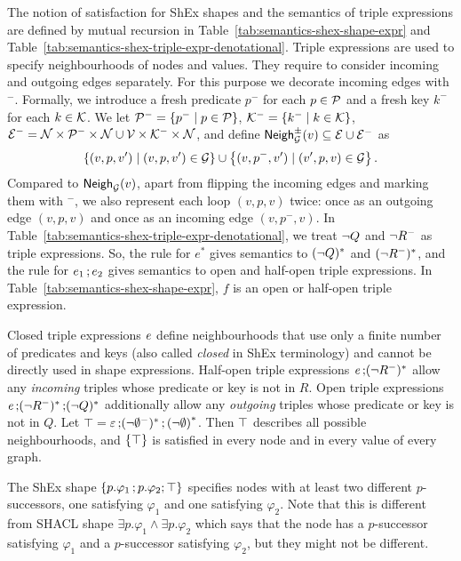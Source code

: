 The notion of satisfaction for ShEx shapes and the semantics of triple expressions are defined by mutual recursion in Table~\ref{tab:semantics-shex-shape-expr} and Table~\ref{tab:semantics-shex-triple-expr-denotational}.
Triple expressions are used to specify neighbourhoods of nodes and values. They require to consider incoming and outgoing edges separately. For this purpose we decorate incoming edges with ${}^{-}$. Formally, we introduce a fresh predicate $p^{-}$ for each $p\in\mathcal{P}$ and a fresh key $k^{-}$ for each $k\in\mathcal{K}$. We  let $\mathcal{P}^{-}= \left\{p^{-} \mid p\in \mathcal{P}\right\}$,
$\mathcal{K}^{-}= \left\{k^{-} \mid k\in \mathcal{K}\right\}$,
$\mathcal{E}^{-} = \mathcal{N} \times \mathcal{P}^{-} \times \mathcal{N} \cup \mathcal{V} \times \mathcal{K}^{-} \times \mathcal{N}$, and define $\mathsf{Neigh}^{\pm}_{\mathcal{G}}(v) \subseteq \mathcal{E} \cup\mathcal{E}^{-}$ as
\[ \left \{ (v, p, v') \mid (v, p, v') \in \mathcal{G}\right\} \cup \left\{(v, p^{-}, v') \mid (v', p, v) \in \mathcal{G} \right\}.\] Compared to $\mathsf{Neigh}_{\mathcal{G}}(v)$, apart from flipping the incoming edges and marking them with ${}^{-}$, we also represent each loop $(v,p,v)$ twice: once as an outgoing edge $(v,p,v)$ and once as an incoming edge $(v,p^{-},v)$.
In Table~\ref{tab:semantics-shex-triple-expr-denotational}, we treat $\neg Q$ and  $\neg{R^{-}}$ as triple expressions. So, the rule for $e^{*}$ gives semantics to $(\neg Q)^{*}$ and  $(\neg{R^{-}})^{*}$, and the rule for $e_1\mathop{;} e_2$ gives semantics to open and half-open triple expressions. In Table~\ref{tab:semantics-shex-shape-expr}, $f$ is an  open or half-open triple expression.

Closed triple expressions $e$ define neighbourhoods that use only a finite number of predicates and keys (also called \emph{closed} in ShEx terminology) and cannot be directly used in shape expressions.
Half-open triple expressions $\mathit{e}\mathop{;} (\neg{R^{-}})^{*}$ allow any \emph{incoming} triples whose predicate or key is not in  $R$. Open triple expressions $\mathit{e}\mathop{;} (\neg{R^{-}})^{*} \mathop{;} (\neg Q)^{*}$ additionally allow any \emph{outgoing} triples whose predicate or key is not in $Q$.
%
Let $\top = \varepsilon \mathop{;} (\neg{\emptyset^{-}})^{*} \mathop{;} {(\neg \emptyset)}^{*}$. Then $\top$ describes all possible neighbourhoods, and $\left\{ \top \right\}$ is satisfied in every node and in every value of every graph.

\begin{example}
The ShEx shape $\left\{ p.\varphi_1 \mathop{;} p.\varphi_2;\top \right\}$ specifies nodes with at least two different $p$-successors, one satisfying $\varphi_1$ and one satisfying $\varphi_2$. Note that this is different from SHACL shape $\exists p. \varphi_1 \land \exists p.\varphi_2$ which says that the node has a $p$-successor satisfying $\varphi_1$ and a $p$-successor satisfying $\varphi_2$, but they might not be different.
\end{example}


